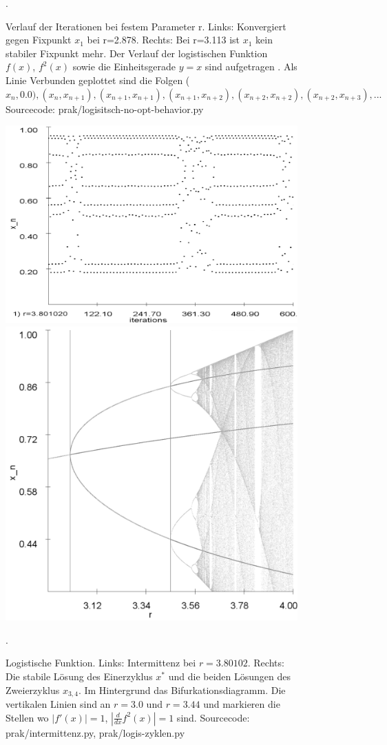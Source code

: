 \documentclass{scrartcl}
\begin{document}
\begin{figure}[!htbp]
\caption{Verlauf der Iterationen bei festem Parameter r. Links: Konvergiert gegen Fixpunkt $x_1$ bei r=2.878. Rechts: Bei r=3.113 ist $x_1$ kein stabiler Fixpunkt mehr. Der Verlauf der logistischen Funktion $f(x)$, $f^2(x)$ sowie die Einheitsgerade $y=x$ sind aufgetragen . Als Linie Verbunden geplottet sind die Folgen ($x_n, 0.0), (x_n, x_{n+1}), (x_{n+1}, x_{n+1}), (x_{n+1}, x_{n+2}), (x_{n+2}, x_{n+2}), (x_{n+2}, x_{n+3}), ...$ Sourcecode: prak/logisitsch-no-opt-behavior.py}. 
\label{fig:log-iteration-behavior}
\end{figure}

\begin{figure}[!htbp]
\centering
\includegraphics[scale=0.22]{intermittenz}
\includegraphics[scale=0.15]{analy-periodenv}
\caption{Logistische Funktion. Links: Intermittenz bei $r=3.80102$. Rechts: Die stabile Lösung des Einerzyklus $x^*$ und die beiden Lösungen des Zweierzyklus $x_{3,4}$. Im Hintergrund das Bifurkationsdiagramm. Die vertikalen Linien sind an $r=3.0$ und $r=3.44$ und markieren die Stellen wo $|f'(x)|=1$, $|\frac{d}{dx}f^2(x)|=1$ sind. Sourcecode: prak/intermittenz.py, prak/logis-zyklen.py}. 
\label{fig:log-intermittenz-cycles}
\end{figure}
\end{document}
